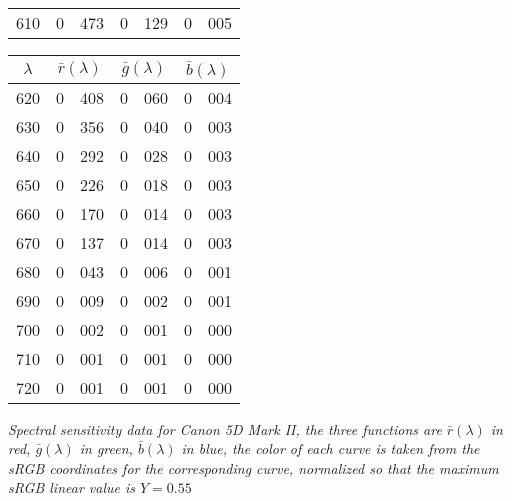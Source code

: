 {{\begin{minipage}{.3\textwidth}
\begin{tabular}{c|r@{.}l | r@{.}l | r@{.}l}
 610 &   0&473 &   0&129 &   0&005 \\
\end{tabular}
\end{minipage}\hfill
\begin{minipage}{.3\textwidth}
\centering
\begin{tabular}{c|r@{.}l | r@{.}l | r@{.}l}
$\lambda$ & \multicolumn{2}{c|}{$\bar r(\lambda)$} &  \multicolumn{2}{c|}{$\bar g(\lambda)$} &  \multicolumn{2}{c}{$\bar b(\lambda)$} \\
\hline
 620 &   0&408 &   0&060 &   0&004 \\
 630 &   0&356 &   0&040 &   0&003 \\
 640 &   0&292 &   0&028 &   0&003 \\
 650 &   0&226 &   0&018 &   0&003 \\
 660 &   0&170 &   0&014 &   0&003 \\
 670 &   0&137 &   0&014 &   0&003 \\
 680 &   0&043 &   0&006 &   0&001 \\
 690 &   0&009 &   0&002 &   0&001 \\
 700 &   0&002 &   0&001 &   0&000 \\
 710 &   0&001 &   0&001 &   0&000 \\
 720 &   0&001 &   0&001 &   0&000 \\
\end{tabular}
\end{minipage}
\vskip 1mm
}
\centering
{\footnotesize\it Spectral sensitivity data for Canon 5D Mark II, the three
functions
are $\bar r(\lambda)$ in red, $\bar g(\lambda)$ in green, $\bar b(\lambda)$ in blue,
the color of each curve is taken from the \gls{sRGB} coordinates for the
corresponding
curve, normalized so that the maximum \gls{sRGB} linear value is $Y = 0.55$
}
\label{tab:canon5dmii}
}


